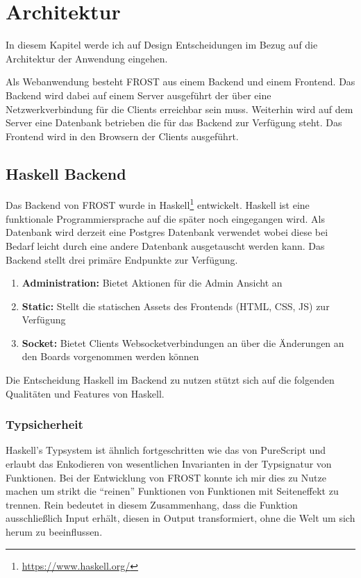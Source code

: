 \chapter{Architektur}
\label{cha:architektur}
In diesem Kapitel werde ich auf Design Entscheidungen im Bezug auf die
Architektur der Anwendung eingehen.

Als Webanwendung besteht FROST aus einem Backend und einem Frontend. Das Backend
wird dabei auf einem Server ausgeführt der über eine Netzwerkverbindung für die
Clients erreichbar sein muss. Weiterhin wird auf dem Server eine Datenbank
betrieben die für das Backend zur Verfügung steht. Das Frontend wird in den
Browsern der Clients ausgeführt.

\section{Haskell Backend}
\label{sec:backend}
Das Backend von FROST wurde in Haskell\footnote{\url{https://www.haskell.org/}}
entwickelt. Haskell ist eine funktionale Programmiersprache auf die später noch
eingegangen wird. Als Datenbank wird derzeit eine Postgres Datenbank verwendet
wobei diese bei Bedarf leicht durch eine andere Datenbank ausgetauscht werden
kann. Das Backend stellt drei primäre Endpunkte zur Verfügung.

\begin{enumerate}
\item \textbf{Administration:} Bietet Aktionen für die Admin Ansicht an
\item \textbf{Static:} Stellt die statischen Assets des Frontends (HTML, CSS, JS)
  zur Verfügung
\item \textbf{Socket:} Bietet Clients Websocketverbindungen an über die
  Änderungen an den Boards vorgenommen werden können
\end{enumerate}

Die Entscheidung Haskell im Backend zu nutzen stützt sich auf die folgenden
Qualitäten und Features von Haskell.

\subsection*{Typsicherheit}
Haskell's Typsystem ist ähnlich fortgeschritten wie das von PureScript und
erlaubt das Enkodieren von wesentlichen Invarianten in der Typsignatur von
Funktionen. Bei der Entwicklung von FROST konnte ich mir dies zu Nutze machen um
strikt die ``reinen'' Funktionen von Funktionen mit Seiteneffekt zu trennen. Rein
bedeutet in diesem Zusammenhang, dass die Funktion ausschließlich Input erhält,
diesen in Output transformiert, ohne die Welt um sich herum zu beeinflussen.


